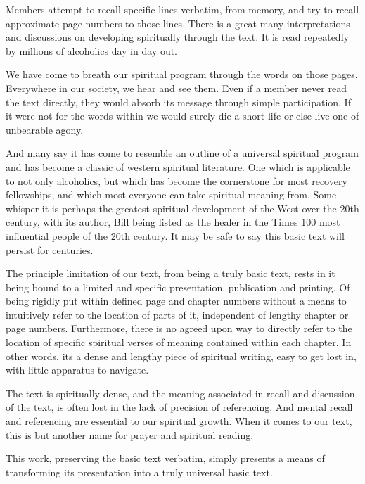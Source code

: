 \begin{fmatterchapter}
Members attempt to recall specific lines verbatim, from memory, 
    and try to recall approximate page numbers to those lines.
There is a great many interpretations and discussions 
    on developing spiritually through the text.
It is read repeatedly by millions of alcoholics day in day out.

We have come to breath our spiritual program 
    through the words on those pages.
Everywhere in our society, we hear and see them.
Even if a member never read the text directly, 
    they would absorb its message through simple participation.
If it were not for the words within 
    we would surely die a short life 
    or else live one of unbearable agony.

And many say it has come to resemble an outline 
    of a universal spiritual program 
    and has become a classic of western spiritual literature.
One which is applicable to not only alcoholics, 
    but which has become the cornerstone for most recovery fellowships,
    and which most everyone can take spiritual meaning from.
Some whisper it is perhaps the greatest spiritual development of the West 
    over the 20th century, with its author, Bill 
    being listed as the healer in the Times 100 most influential people 
    of the 20th century.
It may be safe to say this basic text will persist for centuries.

The principle limitation of our text, from being a truly basic text, 
    rests in it being bound to a limited and specific 
    presentation, publication and printing.
Of being rigidly put within defined page and chapter numbers 
    without a means to intuitively refer to the location of parts of it, 
    independent of lengthy chapter or page numbers.
Furthermore, there is no agreed upon way to directly refer 
    to the location of specific spiritual verses of meaning 
    contained within each chapter.
In other words, its a dense and lengthy piece of spiritual writing, 
    easy to get lost in, 
    with little apparatus to navigate.

The text is spiritually dense, 
    and the meaning associated in recall and discussion of the text, 
    is often lost in the lack of precision of referencing.
And mental recall and referencing are essential to our spiritual growth.
When it comes to our text, this is but another name for prayer and spiritual reading.

This work, preserving the basic text verbatim, 
    simply presents a means of transforming its presentation 
    into a truly universal basic text.


\end{fmatterchapter}
